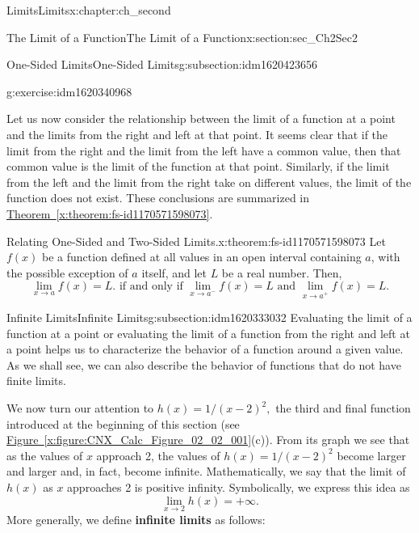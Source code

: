 \documentclass[oneside,10pt,]{book}
\newcommand{\xreffont}{\relax}
\newcommand{\terminology}[1]{\textbf{#1}}
\numberwithin{equation}{section}
\begin{document}
\begin{chapterptx}{Limits}{}{Limits}{}{}{x:chapter:ch_second}
\begin{sectionptx}{The Limit of a Function}{}{The Limit of a Function}{}{}{x:section:sec_Ch2Sec2}
\begin{subsectionptx}{One-Sided Limits}{}{One-Sided Limits}{}{}{g:subsection:idm1620423656}
\begin{inlineexercise}{}{g:exercise:idm1620340968}
\end{inlineexercise}%
Let us now consider the relationship between the limit of a function at a point and the limits from the right and left at that point. It seems clear that if the limit from the right and the limit from the left have a common value, then that common value is the limit of the function at that point. Similarly, if the limit from the left and the limit from the right take on different values, the limit of the function does not exist. These conclusions are summarized in \hyperref[x:theorem:fs-id1170571598073]{Theorem~{\xreffont\ref{x:theorem:fs-id1170571598073}}}.%
\begin{theorem}{Relating One-Sided and Two-Sided Limits.}{}{x:theorem:fs-id1170571598073}%
Let \(f(x)\) be a function defined at all values in an open interval containing \(a \), with the possible exception of \(a \) itself, and let \(L \) be a real number. Then,%
%
\begin{equation*}
\lim_{x \to a} f(x)=L. \text{ if and only if } \lim_{x\to a^{-} }f(x)=L \text{ and } \lim_{x\to a^{+}}f(x)=L.
\end{equation*}
\end{theorem}
\end{subsectionptx}
%
%
\typeout{************************************************}
\typeout{************************************************}
%
\begin{subsectionptx}{Infinite Limits}{}{Infinite Limits}{}{}{g:subsection:idm1620333032}
Evaluating the limit of a function at a point or evaluating the limit of a function from the right and left at a point helps us to characterize the behavior of a function around a given value. As we shall see, we can also describe the behavior of functions that do not have finite limits.%
\par
We now turn our attention to \(h(x)=1/ (x-2)^2 ,\) the third and final function introduced at the beginning of this section (see \hyperref[x:figure:CNX_Calc_Figure_02_02_001]{Figure~{\xreffont\ref{x:figure:CNX_Calc_Figure_02_02_001}}}(c)). From its graph we see that as the values of \(x\) approach 2, the values of \(h(x)=1/ (x-2)^2 \) become larger and larger and, in fact, become infinite. Mathematically, we say that the limit of \(h(x)\) as \(x\) approaches 2 is positive infinity. Symbolically, we express this idea as%
%
\begin{equation*}
\lim_{x\to 2}h(x)=+\infty.
\end{equation*}
More generally, we define \terminology{infinite limits} as follows:%

\end{subsectionptx}
\end{sectionptx}
\end{chapterptx}
\end{document}
